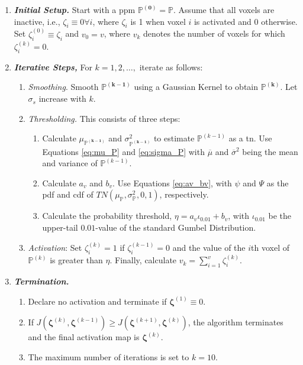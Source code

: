 \begin{enumerate}
\item \textbf{\textit{Initial Setup.}} Start with a \gls{ppm} $\bm{\mathbb{P}^{(0)}} = \bm{\mathbb{P}}$. Assume that all voxels are inactive, i.e., $\zeta_i \equiv 0 \forall i$, where $\zeta_i$ is 1 when voxel $i$ is activated and 0 otherwise. Set $\zeta_i^{(0)} \equiv \zeta_i$ and $v_0 = v$, where $v_k$ denotes the number of voxels for which $\zeta_i^{(k)} = 0$.
\item \textbf{\textit{Iterative Steps,}} For $k=1,2,\dots,$ iterate as follows:
\begin{enumerate}
\item \textit{Smoothing}. Smooth $\bm{\mathbb{P}^{(k-1)}}$ using a Gaussian Kernel to obtain $\bm{\mathbb{P}^{(k)}}$. Let $\sigma_s$ increase with $k$.
\item \textit{Thresholding.} This consists of three steps:
\begin{enumerate}
\item Calculate $\mu_{\bm{\mathbb{P}^{(k-1)}}}$ and $\sigma^2_{\bm{\mathbb{P}^{(k-1)}}}$ to estimate $\mathbb{P}^{(k-1)}$ as a \gls{tn}. Use Equations \ref{eq:mu_P} and \ref{eq:sigma_P} with $\overline{\mu}$ and $\overline{\sigma}^2$ being the mean and variance of $\mathbb{P}^{(k-1)}$.
\item Calculate $a_v$ and $b_v$. Use Equations \ref{eq:av_bv}, with $\psi$ and $\Psi$ as the \gls{pdf} and \gls{cdf} of $TN\left( \mu_{\bm{\mathbb{P}}}, \sigma^2_{\bm{\mathbb{P}}}, 0,1 \right)$, respectively.
\item Calculate the probability threshold, $\eta=a_v\iota_{0.01}+b_v$, with $\iota_{0.01}$ be the upper-tail $0.01$-value of the standard Gumbel Distribution.
\end{enumerate}
\item \textit{Activation}: Set $\zeta_i^{(k)} = 1$ if $\zeta_i^{(k-1)} = 0$ and the value of the $i$th voxel of $\mathbb{P}^{(k)}$ is greater than $\eta$. Finally, calculate $v_k=\sum_{i=1}^v\zeta_i^{(k)}$.
\end{enumerate}
\item \textbf{\textit{Termination.}}
\begin{enumerate}
\item Declare no activation and terminate if $\bm{\zeta}^{(1)} \equiv 0$.
\item If $J(\bm{\zeta}^{(k)},\bm{\zeta}^{(k-1)}) \geq J(\bm{\zeta}^{(k+1)},\bm{\zeta}^{(k)})$, the algorithm terminates and the final activation map is $\bm{\zeta}^{(k)}$.
\item The maximum number of iterations is set to $k=10$.
\end{enumerate}
\end{enumerate}